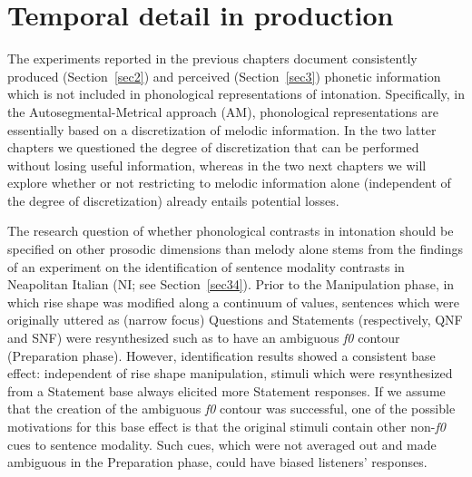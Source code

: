 \chapter[Temporal detail in production]{Temporal detail in production}\label{sec4}
The experiments reported in the previous chapters document consistently produced (Section~\ref{sec2}) and perceived (Section~\ref{sec3}) phonetic information which is not included in phonological representations of intonation. Specifically, in the Auto\-seg\-men\-tal-Metrical approach (AM), phonological representations are essentially based on a discretization of melodic information. In the two latter chapters we questioned the degree of discretization that can be performed without losing useful information, whereas in the two next chapters we will explore whether or not restricting to melodic information alone (independent of the degree of discretization) already entails potential losses. 

The research question of whether phonological contrasts in intonation should be specified on other prosodic dimensions than melody alone stems from the findings of an experiment on the identification of sentence modality contrasts in Neapolitan Italian (NI; see Section~\ref{sec34}). Prior to the Manipulation phase, in which rise shape was modified along a continuum of values, sentences which were originally uttered as (narrow focus) Questions and Statements (respectively, QNF and SNF) were resynthesized such as to have an ambiguous \textit{f0} contour (Preparation phase). However, identification results showed a consistent base effect: independent of rise shape manipulation, stimuli which were resynthesized from a Statement base always elicited more Statement responses. If we assume that the creation of the ambiguous \textit{f0} contour was successful, one of the possible motivations for this base effect is that the original stimuli contain other non-\textit{f0} cues to sentence modality. Such cues, which were not averaged out and made ambiguous in the Preparation phase, could have biased listeners' responses.

